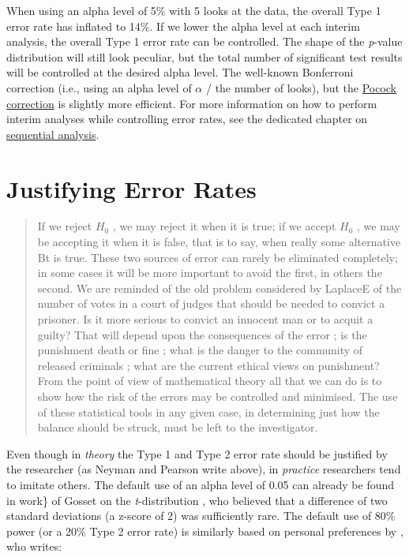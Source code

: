 \documentclass[
  oneside]{book}
\begin{document}
When using an alpha level of 5\% with 5 looks at the data, the overall Type 1 error rate has inflated to 14\%. If we lower the alpha level at each interim analysis, the overall Type 1 error rate can be controlled. The shape of the \emph{p}-value distribution will still look peculiar, but the total number of significant test results will be controlled at the desired alpha level. The well-known Bonferroni correction (i.e., using an alpha level of \(\alpha\) / the number of looks), but the \href{https://en.wikipedia.org/wiki/Pocock_boundary}{Pocock correction} is slightly more efficient. For more information on how to perform interim analyses while controlling error rates, see the dedicated chapter on \protect\hyperlink{sequential}{sequential analysis}.

\hypertarget{justifyerrorrate}{%
\section{Justifying Error Rates}\label{justifyerrorrate}}

\begin{quote}
If we reject \(H_0\) , we may reject it when it is true; if we accept \(H_0\) , we may be accepting it when it is false, that is to say, when really some alternative Bt is true. These two sources of error can rarely be eliminated completely; in some cases it will be more important to avoid the first, in others the second. We are reminded of the old problem considered by LaplaceE of the number of votes in a court of judges that should be needed to convict a prisoner. Is it more serious to convict an innocent man or to acquit a guilty? That will depend upon the consequences of the error ; is the punishment death or fine ; what is the danger to the community of released criminals ; what are the current ethical views on punishment? From the point of view of mathematical theory all that we can do is to show how the risk of the errors may be controlled and minimised. The use of these statistical tools in any given case, in determining just how the balance should be struck, must be left to the investigator.
\end{quote}

Even though in \emph{theory} the Type 1 and Type 2 error rate should be justified by the researcher (as Neyman and Pearson \citeyearpar{neyman_problem_1933} write above), in \emph{practice} researchers tend to imitate others. The default use of an alpha level of 0.05 can already be found in work\} of Gosset on the \emph{t}-distribution \citep{cowles_origins_1982, kennedy-shaffer_before_2019}, who believed that a difference of two standard deviations (a z-score of 2) was sufficiently rare. The default use of 80\% power (or a 20\% Type 2 error rate) is similarly based on personal preferences by \citet{cohen_statistical_1988}, who writes:
\end{document}
